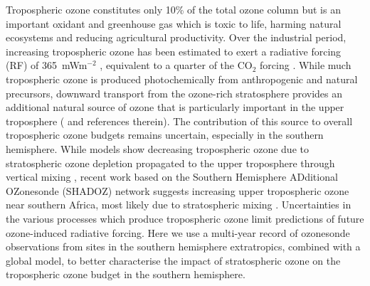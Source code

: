 
Tropospheric ozone constitutes only 10\% of the total ozone column but is an important oxidant and greenhouse gas which is toxic to life, harming natural ecosystems and reducing agricultural productivity.
Over the industrial period, increasing tropospheric ozone has been estimated to exert a radiative forcing (RF) of 365~mWm$^{-2}$  \citep{Stevenson2013}, equivalent to a quarter of the CO$_2$ forcing \citep{IPCC_Chapter2}. 
While much tropospheric ozone is produced photochemically from anthropogenic and natural precursors, %
downward transport from the ozone-rich stratosphere provides an additional natural source of ozone that is particularly important in the upper troposphere (\citet{Jacobson2000} and references therein).
The contribution of this source to overall tropospheric ozone budgets remains uncertain, especially in the southern hemisphere.
While models show decreasing tropospheric ozone due to stratospheric ozone depletion propagated to the upper troposphere through vertical mixing \citep{Stevenson2013}, recent work based on the  Southern Hemisphere ADditional OZonesonde (SHADOZ) network suggests increasing upper tropospheric ozone near southern Africa, most likely due to stratospheric mixing \citep{Liu2015, Thompson2014}.
Uncertainties in the various processes which produce tropospheric ozone limit predictions of future ozone-induced radiative forcing.
Here we use a multi-year record of ozonesonde observations from sites in the southern hemisphere extratropics, combined with a global model, to better characterise the impact of stratospheric ozone on the tropospheric ozone budget in the southern hemisphere.

